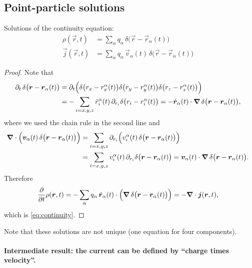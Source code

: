 \documentclass[../../../main.tex]{subfiles}
\begin{document}
\subsection{Point-particle solutions}

Solutions of the continuity equation:
\begin{align}
\rho(\vec r,t)&=\sum_\alpha q_\alpha\,\delta\bigl(\vec r-\vec r_\alpha(t)\bigr) \label{eq:continuity_solution_rho}\\
\vec j(\vec r,t)&=\sum_\alpha q_\alpha\,\vec v_\alpha(t)\,\delta\bigl(\vec r-\vec r_\alpha(t)\bigr)
\label{eq:continuity_solution_j}
\end{align}

\begin{proof}
Note that
\begin{align}
\partial_t\,\delta\bigl(\vec r-\vec r_\alpha(t)\bigr)
&=\partial_t\Bigl(\delta\bigl(r_x-r_x^\alpha(t)\bigr)\delta\bigl(r_y-r_y^\alpha(t)\bigr)
\delta\bigl(r_z-r_z^\alpha(t)\bigr)\Bigr)\notag\\
&= -\sum_{i=x,y,z}\dot r_i^\alpha(t)\,\partial_{r_i}\delta\bigl(r_i-r_i^\alpha(t)\bigr)
=-\dot{\vec r}_\alpha(t)\cdot\vec\nabla\,\delta\bigl(\vec r-\vec r_\alpha(t)\bigr),
\end{align}
where we used the chain rule in the second line and
\begin{align}
\vec\nabla\cdot\Bigl(\vec v_\alpha(t)\,\delta\bigl(\vec r-\vec r_\alpha(t)\bigr)\Bigr)
&=\sum_{i=x,y,z}\partial_{r_i}\Bigl(v_i^\alpha(t)\,\delta\bigl(\vec r-\vec r_\alpha(t)\bigr)\Bigr)\notag\\
&=\sum_{i=x,y,z}v_i^\alpha(t)\,\partial_{r_i}\delta\bigl(\vec r-\vec r_\alpha(t)\bigr)
=\vec v_\alpha(t)\cdot\vec\nabla\,\delta\bigl(\vec r-\vec r_\alpha(t)\bigr).
\end{align}
Therefore
\begin{equation}
\frac{\partial}{\partial t}\rho(\vec r,t)
=-\sum_\alpha q_\alpha\,\dot{\vec r}_\alpha(t)\cdot
\Bigl(\vec\nabla\,\delta\bigl(\vec r-\vec r_\alpha(t)\bigr)\Bigr)
=-\vec\nabla\cdot\vec j(\vec r,t),
\end{equation}
which is \eqref{eq:continuity}.
\end{proof}

Note that these solutions are not unique (one equation for four components). 
\paragraph{Intermediate result: the current can be defined by ``charge times velocity''.}
\end{document}
